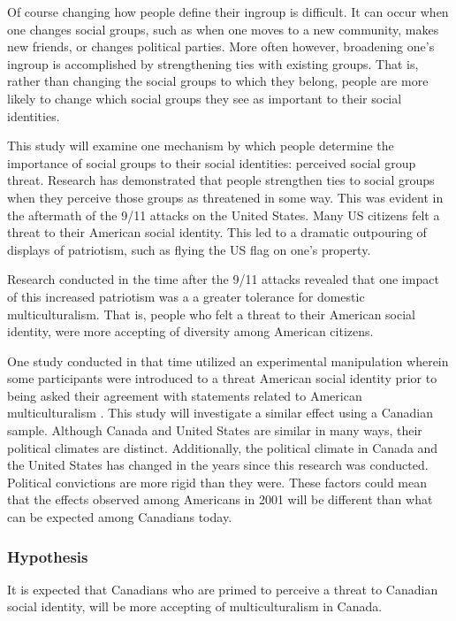 \documentclass[
]{book}
\begin{document}
Of course changing how people define their ingroup is difficult. It can occur when one changes social groups, such as when one moves to a new community, makes new friends, or changes political parties. More often however, broadening one's ingroup is accomplished by strengthening ties with existing groups. That is, rather than changing the social groups to which they belong, people are more likely to change which social groups they see as important to their social identities.

This study will examine one mechanism by which people determine the importance of social groups to their social identities: perceived social group threat. Research has demonstrated that people strengthen ties to social groups when they perceive those groups as threatened in some way. This was evident in the aftermath of the 9/11 attacks on the United States. Many US citizens felt a threat to their American social identity. This led to a dramatic outpouring of displays of patriotism, such as flying the US flag on one's property.

Research conducted in the time after the 9/11 attacks revealed that one impact of this increased patriotism was a a greater tolerance for domestic multiculturalism. That is, people who felt a threat to their American social identity, were more accepting of diversity among American citizens.

One study conducted in that time utilized an experimental manipulation wherein some participants were introduced to a threat American social identity prior to being asked their agreement with statements related to American multiculturalism \citep{davies2008}. This study will investigate a similar effect using a Canadian sample. Although Canada and United States are similar in many ways, their political climates are distinct. Additionally, the political climate in Canada and the United States has changed in the years since this research was conducted. Political convictions are more rigid than they were. These factors could mean that the effects observed among Americans in 2001 will be different than what can be expected among Canadians today.

\hypertarget{hypothesis-1}{%
\subsubsection{Hypothesis}\label{hypothesis-1}}

It is expected that Canadians who are primed to perceive a threat to Canadian social identity, will be more accepting of multiculturalism in Canada.
\end{document}
